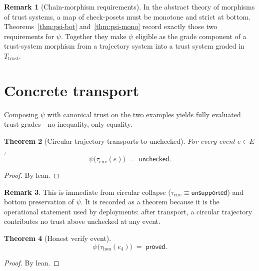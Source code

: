\documentclass[11pt,a4paper]{article}
\theoremstyle{plain}
\newtheorem{theorem}{Theorem}[section]
\theoremstyle{definition}
\newtheorem{remark}[theorem]{Remark}
\newcommand{\tauu}{\tau}
\begin{document}
\begin{remark}[Chain-morphism requirements]
In the abstract theory of morphisms of trust systems, a map of check-posets
must be monotone and strict at bottom. Theorems~\ref{thm:psi-bot}
and~\ref{thm:psi-mono} record exactly those two requirements for $\psi$.
Together they make $\psi$ eligible as the grade component of a trust-system
morphism from a trajectory system into a trust system graded in
$T_{\mathrm{trust}}$.
\end{remark}

\section{Concrete transport}

Composing $\psi$ with canonical trust on the two examples yields fully
evaluated trust grades---no inequality, only equality.

\begin{theorem}[Circular trajectory transports to unchecked]
\label{thm:psi-circular}
For every event $e \in E$,
\begin{equation}
  \psi\bigl(\tauu_{\mathrm{circ}}(e)\bigr)
  \;=\;
  \mathsf{unchecked}.
\end{equation}
\end{theorem}

\begin{proof}
By lean.
\end{proof}

\begin{remark}
This is immediate from circular collapse
($\tauu_{\mathrm{circ}} \equiv \mathsf{unsupported}$) and bottom
preservation of $\psi$. It is recorded as a theorem because it is the
operational statement used by deployments: after transport, a circular
trajectory contributes no trust above unchecked at any event.
\end{remark}

\begin{theorem}[Honest verify event]\label{thm:psi-honest-e4}
\begin{equation}
  \psi\bigl(\tauu_{\mathrm{hon}}(e_4)\bigr)
  \;=\;
  \mathsf{proved}.
\end{equation}
\end{theorem}

\begin{proof}
By lean.
\end{proof}
\end{document}
